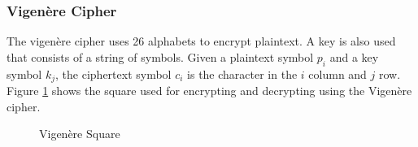 \documentclass[12pt]{article}
\begin{document}
\subsubsection{Vigen\`{e}re Cipher}
The vigen\`{e}re cipher uses 26 alphabets to encrypt plaintext. A key is also used that consists of a string of symbols. Given a plaintext symbol $p_i$ and a key symbol $k_j$, the ciphertext symbol $c_i$ is the character in the $i$ column and $j$ row.
Figure \ref{vigsquare} shows the square used for encrypting and decrypting using the Vigen\`{e}re cipher.

\begin{figure}[ht]
	
		\caption{Vigen\`{e}re Square}
		\label{vigsquare}
	
\begin{adjustbox}{max width=\textwidth}
	

\end{adjustbox}
\end{figure}
\end{document}
